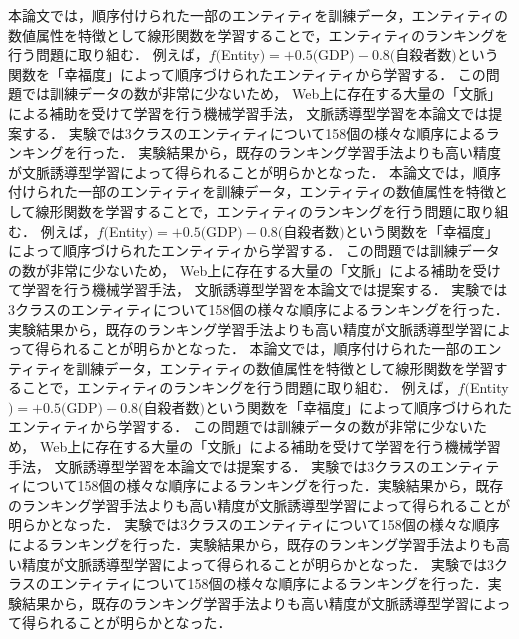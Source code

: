 \begin{abst}
本論文では，順序付けられた一部のエンティティを訓練データ，エンティティの数値属性を特徴として線形関数を学習することで，エンティティのランキングを行う問題に取り組む．
例えば，$f($Entity$) = +0.5($GDP$) − 0.8($自殺者数$)$という関数を「幸福度」によって順序づけられたエンティティから学習する．
この問題では訓練データの数が非常に少ないため，
Web上に存在する大量の「文脈」による補助を受けて学習を行う機械学習手法，
文脈誘導型学習を本論文では提案する．
実験では3クラスのエンティティについて158個の様々な順序によるランキングを行った．
実験結果から，既存のランキング学習手法よりも高い精度が文脈誘導型学習によって得られることが明らかとなった．
本論文では，順序付けられた一部のエンティティを訓練データ，エンティティの数値属性を特徴として線形関数を学習することで，エンティティのランキングを行う問題に取り組む．
例えば，$f($Entity$) = +0.5($GDP$) − 0.8($自殺者数$)$という関数を「幸福度」によって順序づけられたエンティティから学習する．
この問題では訓練データの数が非常に少ないため，
Web上に存在する大量の「文脈」による補助を受けて学習を行う機械学習手法，
文脈誘導型学習を本論文では提案する．
実験では3クラスのエンティティについて158個の様々な順序によるランキングを行った．
実験結果から，既存のランキング学習手法よりも高い精度が文脈誘導型学習によって得られることが明らかとなった．
本論文では，順序付けられた一部のエンティティを訓練データ，エンティティの数値属性を特徴として線形関数を学習することで，エンティティのランキングを行う問題に取り組む．
例えば，$f($Entity$) = +0.5($GDP$) − 0.8($自殺者数$)$という関数を「幸福度」によって順序づけられたエンティティから学習する．
この問題では訓練データの数が非常に少ないため，
Web上に存在する大量の「文脈」による補助を受けて学習を行う機械学習手法，
文脈誘導型学習を本論文では提案する．
実験では3クラスのエンティティについて158個の様々な順序によるランキングを行った．実験結果から，既存のランキング学習手法よりも高い精度が文脈誘導型学習によって得られることが明らかとなった．
実験では3クラスのエンティティについて158個の様々な順序によるランキングを行った．実験結果から，既存のランキング学習手法よりも高い精度が文脈誘導型学習によって得られることが明らかとなった．
実験では3クラスのエンティティについて158個の様々な順序によるランキングを行った．実験結果から，既存のランキング学習手法よりも高い精度が文脈誘導型学習によって得られることが明らかとなった．

\end{abst}
